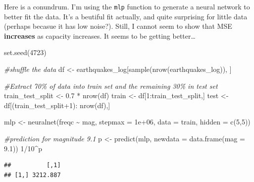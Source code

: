 \documentclass[
]{article}
\newenvironment{Shaded}{\begin{snugshade}}{\end{snugshade}}
\newcommand{\AttributeTok}[1]{\textcolor[rgb]{0.77,0.63,0.00}{#1}}
\newcommand{\CommentTok}[1]{\textcolor[rgb]{0.56,0.35,0.01}{\textit{#1}}}
\newcommand{\DecValTok}[1]{\textcolor[rgb]{0.00,0.00,0.81}{#1}}
\newcommand{\FloatTok}[1]{\textcolor[rgb]{0.00,0.00,0.81}{#1}}
\newcommand{\FunctionTok}[1]{\textcolor[rgb]{0.00,0.00,0.00}{#1}}
\newcommand{\NormalTok}[1]{#1}
\newcommand{\OtherTok}[1]{\textcolor[rgb]{0.56,0.35,0.01}{#1}}
\newcommand{\SpecialCharTok}[1]{\textcolor[rgb]{0.00,0.00,0.00}{#1}}
\begin{document}
Here is a conundrum. I'm using the \texttt{mlp} function to generate a
neural network to better fit the data. It's a beutiful fit actually, and
quite surprising for little data (perhaps becasue it has low noise?).
Still, I cannot seem to show that MSE \textbf{increases} as capacity
increases. It seems to be getting better\ldots{}

\begin{Shaded}
\begin{Highlighting}[]
\FunctionTok{set.seed}\NormalTok{(}\DecValTok{4723}\NormalTok{)}

\CommentTok{\#shuffle the data}
\NormalTok{df }\OtherTok{\textless{}{-}}\NormalTok{ earthquakes\_log[}\FunctionTok{sample}\NormalTok{(}\FunctionTok{nrow}\NormalTok{(earthquakes\_log)), ]}

\CommentTok{\#Extract 70\% of data into train set and the remaining 30\% in test set}
\NormalTok{train\_test\_split }\OtherTok{\textless{}{-}} \FloatTok{0.7} \SpecialCharTok{*} \FunctionTok{nrow}\NormalTok{(df)}
\NormalTok{train }\OtherTok{\textless{}{-}}\NormalTok{ df[}\DecValTok{1}\SpecialCharTok{:}\NormalTok{train\_test\_split,]}
\NormalTok{test }\OtherTok{\textless{}{-}}\NormalTok{ df[(train\_test\_split}\SpecialCharTok{+}\DecValTok{1}\NormalTok{)}\SpecialCharTok{:} \FunctionTok{nrow}\NormalTok{(df),]}

\NormalTok{mlp }\OtherTok{\textless{}{-}} \FunctionTok{neuralnet}\NormalTok{(freqc }\SpecialCharTok{\textasciitilde{}}\NormalTok{ mag,}
                 \AttributeTok{stepmax =} \FloatTok{1e+06}\NormalTok{,}
                 \AttributeTok{data =}\NormalTok{ train,}
                 \AttributeTok{hidden =} \FunctionTok{c}\NormalTok{(}\DecValTok{5}\NormalTok{,}\DecValTok{5}\NormalTok{))}

\CommentTok{\#prediction for magnitude 9.1}
\NormalTok{p }\OtherTok{\textless{}{-}} \FunctionTok{predict}\NormalTok{(mlp, }\AttributeTok{newdata =} \FunctionTok{data.frame}\NormalTok{(}\AttributeTok{mag =} \FloatTok{9.1}\NormalTok{))}
\DecValTok{1}\SpecialCharTok{/}\DecValTok{10}\SpecialCharTok{\^{}}\NormalTok{p}
\end{Highlighting}
\end{Shaded}

\begin{verbatim}
##          [,1]
## [1,] 3212.887
\end{verbatim}
\end{document}

